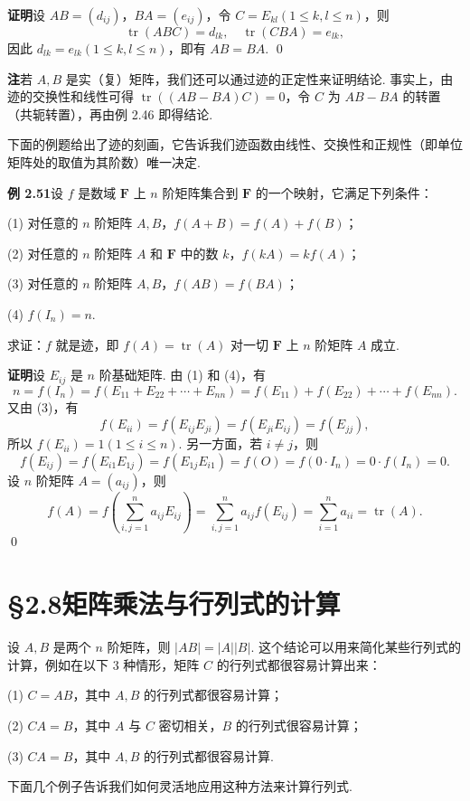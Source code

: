 \documentclass[UTF8,12pt,a4paper,fontset=fandol]{ctexart}
\begin{document}
\noindent\textbf{证明}\quad 设 $AB=(d_{ij})$，$BA=(e_{ij})$，令 $C=E_{kl}(1\le k,l\le n)$，则
\[
\operatorname{tr}(ABC)=d_{lk},\quad \operatorname{tr}(CBA)=e_{lk},
\]
因此 $d_{lk}=e_{lk}(1\le k,l\le n)$，即有 $AB=BA$. \qed

\noindent\textbf{注}\quad 若 $A,B$ 是实（复）矩阵，我们还可以通过迹的正定性来证明结论. 事实上，由迹的交换性和线性可得 $\operatorname{tr}((AB-BA)C)=0$，令 $C$ 为 $AB-BA$ 的转置（共轭转置），再由例 2.46 即得结论.

下面的例题给出了迹的刻画，它告诉我们迹函数由线性、交换性和正规性（即单位矩阵处的取值为其阶数）唯一决定.

\noindent\textbf{例 2.51}\quad 设 $f$ 是数域 $\mathbf F$ 上 $n$ 阶矩阵集合到 $\mathbf F$ 的一个映射，它满足下列条件：

(1) 对任意的 $n$ 阶矩阵 $A,B$，$f(A+B)=f(A)+f(B)$；

(2) 对任意的 $n$ 阶矩阵 $A$ 和 $\mathbf F$ 中的数 $k$，$f(kA)=kf(A)$；

(3) 对任意的 $n$ 阶矩阵 $A,B$，$f(AB)=f(BA)$；

(4) $f(I_n)=n$.

求证：$f$ 就是迹，即 $f(A)=\operatorname{tr}(A)$ 对一切 $\mathbf F$ 上 $n$ 阶矩阵 $A$ 成立.

\noindent\textbf{证明}\quad 设 $E_{ij}$ 是 $n$ 阶基础矩阵. 由 (1) 和 (4)，有
\[
n=f(I_n)=f(E_{11}+E_{22}+\cdots+E_{nn})=f(E_{11})+f(E_{22})+\cdots+f(E_{nn}).
\]
又由 (3)，有
\[
f(E_{ii})=f(E_{ij}E_{ji})=f(E_{ji}E_{ij})=f(E_{jj}),
\]
所以 $f(E_{ii})=1(1\le i\le n)$. 另一方面，若 $i\ne j$，则
\[
f(E_{ij})=f(E_{i1}E_{1j})=f(E_{1j}E_{i1})=f(O)=f(0\cdot I_n)=0\cdot f(I_n)=0.
\]
设 $n$ 阶矩阵 $A=(a_{ij})$，则
\[
f(A)=f\left(\sum_{i,j=1}^n a_{ij}E_{ij}\right)
=\sum_{i,j=1}^n a_{ij}f(E_{ij})
=\sum_{i=1}^n a_{ii}
=\operatorname{tr}(A).
\]
\qed

\section*{§2.8\quad 矩阵乘法与行列式的计算}

设 $A,B$ 是两个 $n$ 阶矩阵，则 $|AB|=|A||B|$. 这个结论可以用来简化某些行列式的计算，例如在以下 3 种情形，矩阵 $C$ 的行列式都很容易计算出来：

(1) $C=AB$，其中 $A,B$ 的行列式都很容易计算；

(2) $CA=B$，其中 $A$ 与 $C$ 密切相关，$B$ 的行列式很容易计算；

(3) $CA=B$，其中 $A,B$ 的行列式都很容易计算.

下面几个例子告诉我们如何灵活地应用这种方法来计算行列式.
\end{document}
